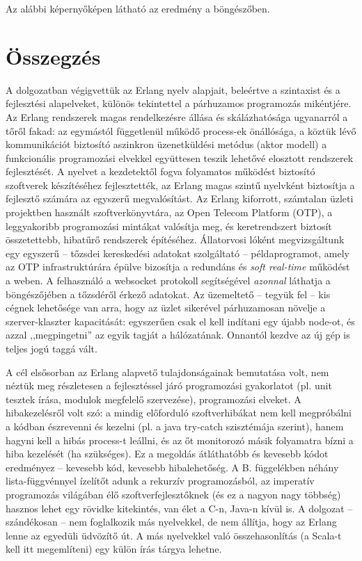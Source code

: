 \documentclass[12pt, a4paper, oneside]{book}
\begin{document}
Az alábbi képernyőképen látható az eredmény a böngészőben.

\chapter{Összegzés}
A dolgozatban végigvettük az Erlang nyelv alapjait, beleértve a szintaxist és
a fejlesztési alapelveket, különös tekintettel a párhuzamos programozás
mikéntjére. Az Erlang rendszerek magas rendelkezésre állása és skálázhatósága
ugyanarról a tőről fakad: az egymástól függetlenül működő process-ek
önállósága, a köztük lévő kommunikációt biztosító aszinkron üzenetküldési
metódus (aktor modell) a funkcionális programozási elvekkel együttesen teszik
lehetővé elosztott rendszerek fejlesztését. A nyelvet a kezdetektől fogva
folyamatos működést biztosító szoftverek készítéséhez fejlesztették, az Erlang 
magas szintű nyelvként biztosítja a fejlesztő számára az egyszerű megvalósítást. 
Az Erlang kiforrott, számtalan üzleti projektben használt szoftverkönyvtára, az Open
Telecom Platform (OTP), a leggyakoribb programozási mintákat valósítja
meg, és keretrendszert biztosít összetettebb, hibatűrő rendszerek építéséhez.
Állatorvosi lóként megvizsgáltunk egy egyszerű -- tőzsdei kereskedési adatokat
szolgáltató -- példaprogramot, amely az OTP infrastruktúrára épülve bizosítja a
redundáns és \emph{soft real-time} működést a weben. A felhasználó a websocket
protokoll segítségével \emph{azonnal} láthatja a böngészőjében a tőzsdéről érkező
adatokat. Az üzemeltető -- tegyük fel -- kis cégnek lehetősége van arra, hogy az
üzlet sikerével párhuzamosan növelje a szerver-klaszter kapacitását: egyszerűen
csak el kell indítani egy újabb node-ot, és azzal ,,megpingetni'' az egyik
tagját a hálózatának. Onnantól kezdve az új gép is teljes jogú taggá vált.

A cél elsősorban az Erlang alapvető tulajdonságainak bemutatása volt, nem
néztük meg részletesen a fejlesztéssel járó programozási gyakorlatot (pl. unit
tesztek írása, modulok megfelelő szervezése), programozási elveket. A
hibakezelésről volt szó: a mindig előforduló szoftverhibákat nem kell megpróbálni
a kódban észrevenni és kezelni (pl. a java try-catch szisztémája szerint),
hanem hagyni kell a hibás process-t leállni, és az őt monitorozó másik
folyamatra bízni a hiba kezelését (ha szükséges). Ez a megoldás átláthatóbb
és kevesebb kódot eredményez -- kevesebb kód, kevesebb hibalehetőség. A B.
függelékben néhány lista-függvénnyel ízelítőt adunk a rekurzív programozásból,
az imperatív programozás világában élő szoftverfejlesztőknek (és ez a nagyon
nagy többség) hasznos lehet egy rövidke kitekintés, van élet a C-n, Java-n
kívül is. A dolgozat -- szándékosan -- nem foglalkozik más nyelvekkel, de nem
állítja, hogy az Erlang lenne az egyedüli üdvözítő út. A más nyelvekkel való
összehasonlítás (a Scala-t kell itt megemlíteni) egy külön írás tárgya lehetne.
\end{document}
